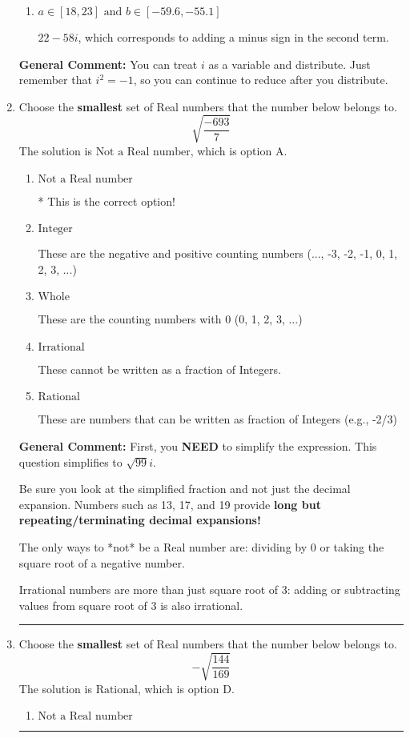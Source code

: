 \documentclass{extbook}[14pt]
\newcommand{\litem}[1]{\item #1

\rule{\textwidth}{0.4pt}}
\begin{document}
\begin{enumerate}
{\begin{enumerate}[label=\Alph*.]
 $-20 + 42 i$, which corresponds to just multiplying the real terms to get the real part of the solution and the coefficients in the complex terms to get the complex part.
\item \( a \in [18, 23] \text{ and } b \in [-59.6, -55.1] \)

 $22 - 58 i$, which corresponds to adding a minus sign in the second term.
\end{enumerate}

\textbf{General Comment:} You can treat $i$ as a variable and distribute. Just remember that $i^2=-1$, so you can continue to reduce after you distribute.
}
\litem{
Choose the \textbf{smallest} set of Real numbers that the number below belongs to.
\[ \sqrt{\frac{-693}{7}} \]
The solution is \( \text{Not a Real number} \), which is option A.\begin{enumerate}[label=\Alph*.]
\item \( \text{Not a Real number} \)

* This is the correct option!
\item \( \text{Integer} \)

These are the negative and positive counting numbers (..., -3, -2, -1, 0, 1, 2, 3, ...)
\item \( \text{Whole} \)

These are the counting numbers with 0 (0, 1, 2, 3, ...)
\item \( \text{Irrational} \)

These cannot be written as a fraction of Integers.
\item \( \text{Rational} \)

These are numbers that can be written as fraction of Integers (e.g., -2/3)
\end{enumerate}

\textbf{General Comment:} First, you \textbf{NEED} to simplify the expression. This question simplifies to $\sqrt{99} i$. 
 
 Be sure you look at the simplified fraction and not just the decimal expansion. Numbers such as 13, 17, and 19 provide \textbf{long but repeating/terminating decimal expansions!} 
 
 The only ways to *not* be a Real number are: dividing by 0 or taking the square root of a negative number. 
 
 Irrational numbers are more than just square root of 3: adding or subtracting values from square root of 3 is also irrational.
}
\litem{
Choose the \textbf{smallest} set of Real numbers that the number below belongs to.
\[ -\sqrt{\frac{144}{169}} \]
The solution is \( \text{Rational} \), which is option D.\begin{enumerate}[label=\Alph*.]
\item \( \text{Not a Real number} \)


\end{enumerate}}
\end{enumerate}
\end{document}
